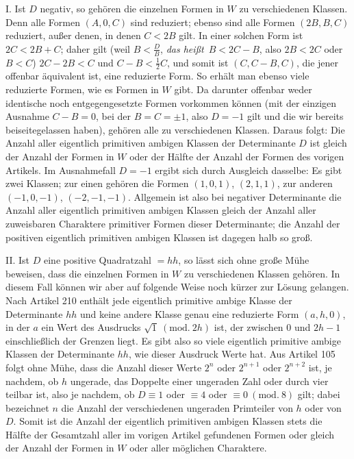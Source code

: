 I. Ist $D$ negativ, so gehören die einzelnen Formen in $W$ zu verschiedenen Klassen. Denn alle Formen $(A,0,C)$ sind reduziert; ebenso sind alle Formen $(2B,B,C)$ reduziert, außer denen, in denen $C<2B$ gilt. In einer solchen Form ist $2C<2B+C$; daher gilt (weil $B<\frac{D}{B}$, \textit{das heißt}\ $B<2C-B$, also $2B<2C$ oder $B<C$) $2C-2B<C$ und $C-B<\frac12 C$, und somit ist $(C,C-B,C)$, die jener offenbar äquivalent ist, eine reduzierte Form. So erhält man ebenso viele reduzierte Formen, wie es Formen in $W$ gibt. Da darunter offenbar weder identische noch entgegengesetzte Formen vorkommen können (mit der einzigen Ausnahme $C-B=0$, bei der $B=C=\pm1$, also $D=-1$ gilt und die wir bereits beiseitegelassen haben), gehören alle zu verschiedenen Klassen. Daraus folgt: Die Anzahl aller eigentlich primitiven ambigen Klassen der Determinante $D$ ist gleich der Anzahl der Formen in $W$ oder der Hälfte der Anzahl der Formen des vorigen Artikels. Im Ausnahmefall $D=-1$ ergibt sich durch Ausgleich dasselbe: Es gibt zwei Klassen; zur einen gehören die Formen $(1,0,1)$, $(2,1,1)$, zur anderen $(-1,0,-1)$, $(-2,-1,-1)$. Allgemein ist also bei negativer Determinante die Anzahl aller eigentlich primitiven ambigen Klassen gleich der Anzahl aller
zuweisbaren Charaktere primitiver Formen dieser Determinante; die Anzahl der positiven eigentlich primitiven ambigen Klassen ist dagegen halb so groß.

II. Ist $D$ eine positive Quadratzahl $=hh$, so lässt sich ohne große Mühe beweisen, dass die einzelnen Formen in $W$ zu verschiedenen Klassen gehören. In diesem Fall können wir aber auf folgende Weise noch kürzer zur Lösung gelangen. Nach Artikel 210 enthält jede eigentlich primitive ambige Klasse der Determinante $hh$ und keine andere Klasse genau eine reduzierte Form $(a,h,0)$, in der $a$ ein Wert des Ausdrucks $\sqrt{1}\ (\mathrm{mod.}\ 2h)$ ist, der zwischen $0$ und $2h-1$ einschließlich der Grenzen liegt. Es gibt also so viele eigentlich primitive ambige Klassen der Determinante $hh$, wie dieser Ausdruck Werte hat. Aus Artikel 105 folgt ohne Mühe, dass die Anzahl dieser Werte $2^n$ oder $2^{n+1}$ oder $2^{n+2}$ ist, je nachdem, ob $h$ ungerade, das Doppelte einer ungeraden Zahl oder durch vier teilbar ist, also je nachdem, ob $D\equiv1$ oder $\equiv4$ oder $\equiv0\ (\mathrm{mod.}\ 8)$ gilt; dabei bezeichnet $n$ die Anzahl der verschiedenen ungeraden Primteiler von $h$ oder von $D$. Somit ist die Anzahl der eigentlich primitiven ambigen Klassen stets die Hälfte der Gesamtzahl aller im vorigen Artikel gefundenen Formen oder gleich der Anzahl der Formen in $W$ oder aller möglichen Charaktere.

